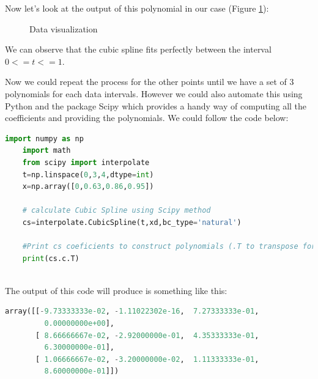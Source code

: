 \documentclass[]{article}
\begin{document}
Now let's look at the output of this polynomial in our case (Figure \ref{fig:p01_visualitzation}):
\begin{figure}[h]
    \centering

   \caption{Data visualization}
   \label{fig:p01_visualitzation}
\end{figure}

We can observe that the cubic spline fits perfectly between the interval $0<=t<=1$.

Now we could repeat the process for the other points until we have a set of 3 polynomials for each data intervals. However we could also automate this using Python and the package Scipy which provides a handy way of computing all the coefficients and providing the polynomials. 
We could follow the code below:
\begin{lstlisting}[language=Python]
    import numpy as np
    import math
    from scipy import interpolate
    t=np.linspace(0,3,4,dtype=int)
    x=np.array([0,0.63,0.86,0.95])

    # calculate Cubic Spline using Scipy method
    cs=interpolate.CubicSpline(t,xd,bc_type='natural')
    
    #Print cs coeficients to construct polynomials (.T to transpose for easy visualitzation)
    print(cs.c.T)
        
\end{lstlisting}

The output of this code will produce is something like this:

\begin{lstlisting}[language=Python]
array([[-9.73333333e-02, -1.11022302e-16,  7.27333333e-01,
         0.00000000e+00],
       [ 8.66666667e-02, -2.92000000e-01,  4.35333333e-01,
         6.30000000e-01],
       [ 1.06666667e-02, -3.20000000e-02,  1.11333333e-01,
         8.60000000e-01]])
\end{lstlisting}
\end{document}
